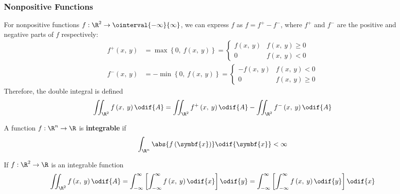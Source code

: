 \documentclass{article}
\begin{document}
\subsubsection{Nonpositive Functions}
For nonpositive functions \(f : \R^2 \to \ointerval{-\infty}{\infty}\),
we can express \(f\) as \(f = f^{+} - f^{-}\), where \(f^{+}\) and
\(f^{-}\) are the positive and negative parts of \(f\) respectively:
\begin{align*}
    f^{+}\left( x,\: y \right) & = \max{\left\{ 0,\: f\left( x,\: y \right) \right\}}
    =
    \begin{cases}
        f\left( x,\: y \right) & f\left( x,\: y \right) \geqslant 0 \\
        0                      & f\left( x,\: y \right) < 0
    \end{cases}
    \\
    f^{-}\left( x,\: y \right) & = -\min{\left\{ 0,\: f\left( x,\: y \right) \right\}}
    =
    \begin{cases}
        -f\left( x,\: y \right) & f\left( x,\: y \right) < 0         \\
        0                       & f\left( x,\: y \right) \geqslant 0
    \end{cases}
\end{align*}
Therefore, the double integral is defined
\begin{equation*}
    \iint_{\R^2} f\left( x,\: y \right) \odif{A} = \iint_{\R^2} f^{+}\left( x,\: y \right) \odif{A} - \iint_{\R^2} f^{-}\left( x,\: y \right) \odif{A}
\end{equation*}
\begin{definition}
    A function \(f : \R^n \to \R\) is \textbf{integrable} if
    \begin{equation*}
        \int_{\R^n} \abs{f\left( \symbf{x} \right)} \odif{\symbf{x}} < \infty
    \end{equation*}
\end{definition}
\begin{theorem}
    If \(f : \R^2 \to \R\) is an integrable function
    \begin{equation*}
        \iint_{\R^2} f\left( x,\: y \right) \odif{A} = \int_{-\infty}^\infty \left[ \int_{-\infty}^\infty f\left( x,\: y \right) \odif{x} \right] \odif{y} = \int_{-\infty}^\infty \left[ \int_{-\infty}^\infty f\left( x,\: y \right) \odif{y} \right] \odif{x}
    \end{equation*}
\end{theorem}
\end{document}
